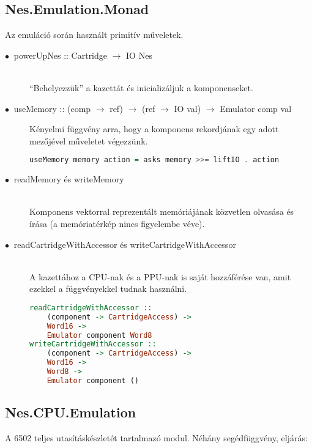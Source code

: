 \subsection{Nes.Emulation.Monad}
Az emuláció során használt primitív műveletek.
\begin{description}
	\item[$\bullet\:$ powerUpNes :: Cartridge $\rightarrow$ IO Nes] \hfill \\
	``Behelyezzük'' a kazettát és inicializáljuk a komponenseket. 
	\item[$\bullet\:$ useMemory :: (comp $\rightarrow$ ref) $\rightarrow$ (ref $\rightarrow$ IO val) $\rightarrow$ Emulator comp val]
	Kényelmi függvény arra, hogy a komponens rekordjának egy adott mezőjével műveletet végezzünk.
\begin{lstlisting}[language=Haskell, basicstyle=\scriptsize]
useMemory memory action = asks memory >>= liftIO . action
\end{lstlisting}
	\item[$\bullet\:$ readMemory és writeMemory] \hfill \\
	Komponens vektorral reprezentált memóriájának közvetlen olvasása és írása (a memóriatérkép nincs figyelembe véve).
	\item[$\bullet\:$ readCartridgeWithAccessor és writeCartridgeWithAccessor] \hfill \\
	A kazettához a CPU-nak és a PPU-nak is saját hozzáférése van, amit ezekkel a függvényekkel tudnak használni.
\begin{lstlisting}[language=Haskell, basicstyle=\scriptsize]
readCartridgeWithAccessor :: 
	(component -> CartridgeAccess) ->
	Word16 -> 
	Emulator component Word8
writeCartridgeWithAccessor ::
	(component -> CartridgeAccess) -> 
	Word16 ->
	Word8 -> 
	Emulator component ()
\end{lstlisting}
\end{description}

\subsection{Nes.CPU.Emulation}
A 6502 teljes utasításkészletét tartalmazó modul. Néhány segédfüggvény, eljárás:

